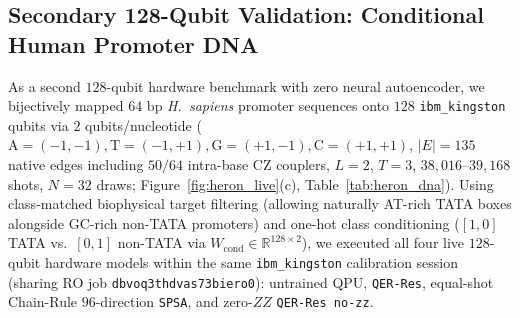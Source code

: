 \documentclass[11pt]{article}
\begin{document}
\subsection{Secondary 128-Qubit Validation: Conditional Human Promoter DNA}
\label{sec:heron_dna}
As a second $128$-qubit hardware benchmark with zero neural autoencoder, we bijectively mapped $64\text{ bp}$ \emph{H.\ sapiens} promoter sequences onto $128$ \texttt{ibm\_kingston} qubits via $2$ qubits/nucleotide ($\text{A}{=}(-1,-1), \text{T}{=}(-1,+1), \text{G}{=}(+1,-1), \text{C}{=}(+1,+1)$, $|E|{=}135$ native edges including $50/64$ intra-base CZ couplers, $L{=}2$, $T{=}3$, $38{,}016$--$39{,}168$ shots, $N{=}32$ draws; Figure~\ref{fig:heron_live}(c), Table~\ref{tab:heron_dna}). Using class-matched biophysical target filtering (allowing naturally AT-rich TATA boxes alongside GC-rich non-TATA promoters) and one-hot class conditioning ($[1,0]$ TATA vs.\ $[0,1]$ non-TATA via $W_{\text{cond}}\in\mathbb{R}^{128\times 2}$), we executed all four live $128$-qubit hardware models within the same \texttt{ibm\_kingston} calibration session (sharing RO job \texttt{dbvoq3thdvas73biero0}): untrained QPU, \texttt{QER-Res}, equal-shot Chain-Rule $96$-direction \texttt{SPSA}, and zero-$ZZ$ \texttt{QER-Res no-zz}.
\end{document}
